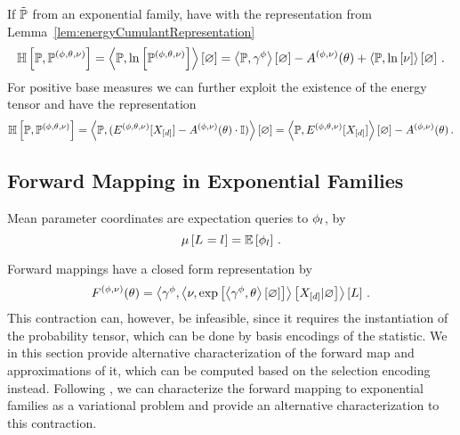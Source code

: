 \begin{example}\label{exa:cEntropyExp}
	If $\tilde{\mathbb{P}}$ from an exponential family, have with the representation from Lemma~\ref{lem:energyCumulantRepresentation}
	\begin{align*}
		\mathbb{H}\left[\mathbb{P},\mathbb{P}^{(\phi,\theta,\nu)}\right] 
		= \left\langle \mathbb{P},\ln \left[ \mathbb{P}^{(\phi,\theta,\nu)} \right]\right\rangle \left[ \varnothing \right] 
		= \left\langle \mathbb{P},\gamma^{\phi}\right\rangle \left[ \varnothing \right] - A^{(\phi,\nu)}(\theta) + \left\langle \mathbb{P},\ln \left[ \nu \right]\right\rangle \left[ \varnothing \right] \, . 
	\end{align*}
	For positive base measures we can further exploit the existence of the energy tensor and have the representation
		\[ \mathbb{H}\left[\mathbb{P},\mathbb{P}^{(\phi,\theta,\nu)}\right] = \left\langle \mathbb{P},(E^{(\phi,\theta,\nu)}[X_{[d]}]-A^{(\phi,\nu)}(\theta)\cdot \mathbb{I})\right\rangle \left[ \varnothing \right]
		=   \left\langle \mathbb{P},E^{(\phi,\theta,\nu)}[X_{[d]}]\right\rangle \left[ \varnothing \right] -A^{(\phi,\nu)}(\theta) \, .   \]
\end{example}




\subsection{Forward Mapping in Exponential Families} 




Mean parameter coordinates are expectation queries to $\phi_{l}$, by 
	\[ \mu\left[L_{}=l_{}\right] = \mathbb{E}\left[\phi_{l}\right] \, . \]
	
Forward mappings have a closed form representation by
	\[ F^{(\phi,\nu)}(\theta)
	= \left\langle \gamma^{\phi},\left\langle \nu,\mathrm{exp}\left[\left\langle \gamma^{\phi},\theta\right\rangle \left[ \varnothing \right]\right]\right\rangle \left[ X_{[d]} | \varnothing \right]\right\rangle \left[ L \right] \, . \]
This contraction can, however, be infeasible, since it requires the instantiation of the probability tensor, which can be done by basis encodings of the statistic.
We in this section provide alternative characterization of the forward map and approximations of it, which can be computed based on the selection encoding instead.
Following \cite{wainwright_graphical_2008}, we can characterize the forward mapping to exponential families as a variational problem and provide an alternative characterization to this contraction.




